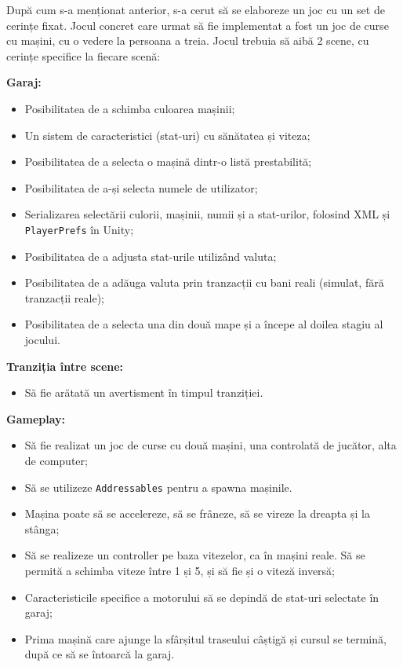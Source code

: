 \documentclass[a4paper,12pt]{report}
\begin{document}
După cum s-a menționat anterior, s-a cerut să se elaboreze un joc cu un set de cerințe fixat.
Jocul concret care urmat să fie implementat a fost un joc de curse cu mașini, cu o vedere la persoana a treia.
Jocul trebuia să aibă 2 scene, cu cerințe specifice la fiecare scenă:

\textbf{Garaj:}
\begin{itemize}
  \item Posibilitatea de a schimba culoarea mașinii;
  \item Un sistem de caracteristici (stat-uri) cu sănătatea și viteza;
  \item Posibilitatea de a selecta o mașină dintr-o listă prestabilită;
  \item Posibilitatea de a-și selecta numele de utilizator;
  \item Serializarea selectării culorii, mașinii, numii și a stat-urilor, folosind \ac{XML} și \texttt{PlayerPrefs} în Unity;
  \item Posibilitatea de a adjusta stat-urile utilizând valuta;
  \item Posibilitatea de a adăuga valuta prin tranzacții cu bani reali (simulat, fără tranzacții reale);
  \item Posibilitatea de a selecta una din două mape și a începe al doilea stagiu al jocului.
\end{itemize}

\textbf{Tranziția între scene:}
\begin{itemize}
  \item Să fie arătată un avertisment în timpul tranziției.
\end{itemize}

\textbf{Gameplay:}
\begin{itemize}
  \item Să fie realizat un joc de curse cu două mașini, una controlată de jucător, alta de computer;
  \item Să se utilizeze \texttt{Addressables} pentru a spawna mașinile.
  \item Mașina poate să se accelereze, să se frâneze, să se vireze la dreapta și la stânga;
  \item Să se realizeze un controller pe baza vitezelor, ca în mașini reale. Să se permită a schimba viteze între 1 și 5, și să fie și o viteză inversă;
  \item Caracteristicile specifice a motorului să se depindă de stat-uri selectate în garaj;
  \item Prima mașină care ajunge la sfârșitul traseului câștigă și cursul se termină, după ce să se întoarcă la garaj.
\end{itemize}
\end{document}
